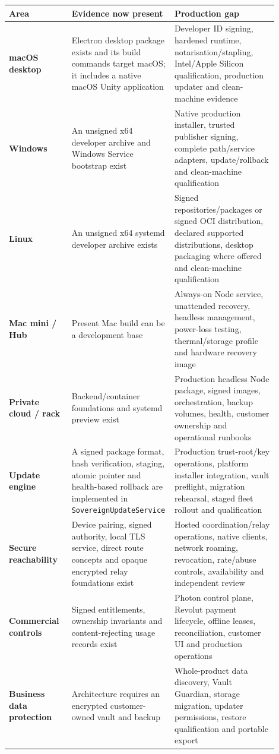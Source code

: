 \documentclass[11pt]{article}
\newcommand{\code}[1]{\texttt{#1}}
\begin{document}
\begin{longtable}{>{\raggedright\arraybackslash\bfseries}p{0.23\linewidth} p{0.29\linewidth} p{0.38\linewidth}}
\toprule
Area & Evidence now present & Production gap \\
\midrule
\endhead
macOS desktop & Electron desktop package exists and its build commands target macOS; it includes a native macOS Unity application & Developer ID signing, hardened runtime, notarisation/stapling, Intel/Apple Silicon qualification, production updater and clean-machine evidence \\
Windows & An unsigned x64 developer archive and Windows Service bootstrap exist & Native production installer, trusted publisher signing, complete path/service adapters, update/rollback and clean-machine qualification \\
Linux & An unsigned x64 systemd developer archive exists & Signed repositories/packages or signed OCI distribution, declared supported distributions, desktop packaging where offered and clean-machine qualification \\
Mac mini / Hub & Present Mac build can be a development base & Always-on Node service, unattended recovery, headless management, power-loss testing, thermal/storage profile and hardware recovery image \\
Private cloud / rack & Backend/container foundations and systemd preview exist & Production headless Node package, signed images, orchestration, backup volumes, health, customer ownership and operational runbooks \\
Update engine & A signed package format, hash verification, staging, atomic pointer and health-based rollback are implemented in \code{SovereignUpdateService} & Production trust-root/key operations, platform installer integration, vault preflight, migration rehearsal, staged fleet rollout and qualification \\
Secure reachability & Device pairing, signed authority, local TLS service, direct route concepts and opaque encrypted relay foundations exist & Hosted coordination/relay operations, native clients, network roaming, revocation, rate/abuse controls, availability and independent review \\
Commercial controls & Signed entitlements, ownership invariants and content-rejecting usage records exist & Photon control plane, Revolut payment lifecycle, offline leases, reconciliation, customer UI and production operations \\
Business data protection & Architecture requires an encrypted customer-owned vault and backup & Whole-product data discovery, Vault Guardian, storage migration, updater permissions, restore qualification and portable export \\
\bottomrule
\end{longtable}
\end{document}
